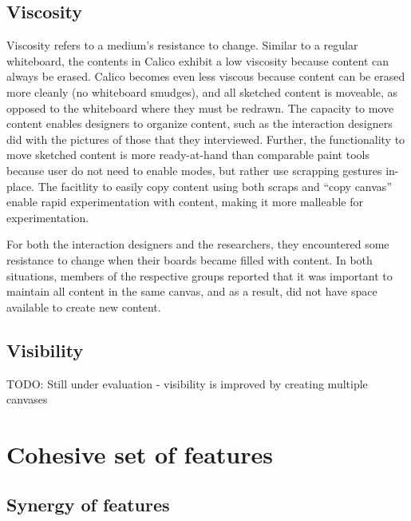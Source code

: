 \subsection{Viscosity}

Viscosity refers to a medium's resistance to change. Similar to a regular whiteboard, the contents in Calico exhibit a low viscosity because content can always be erased. Calico becomes even less viscous because content can be erased more cleanly (no whiteboard smudges), and all sketched content is moveable, as opposed to the whiteboard where they must be redrawn. The capacity to move content enables designers to organize content, such as the interaction designers did with the pictures of those that they interviewed. Further, the functionality to move sketched content is more ready-at-hand than comparable paint tools because user do not need to enable modes, but rather use scrapping gestures in-place. The facitlity to easily copy content using both scraps and ``copy canvas'' enable rapid experimentation with content, making it more malleable for experimentation.

For both the interaction designers and the researchers, they encountered some resistance to change when their boards became filled with content. In both situations, members of the respective groups reported that it was important to maintain all content in the same canvas, and as a result, did not have space available to create new content.


\subsection{Visibility}

TODO: Still under evaluation
- visibility is improved by creating multiple canvases

\section{Cohesive set of features}
\label{chapter:discussion:cohesive-features}

\subsection{Synergy of features}


